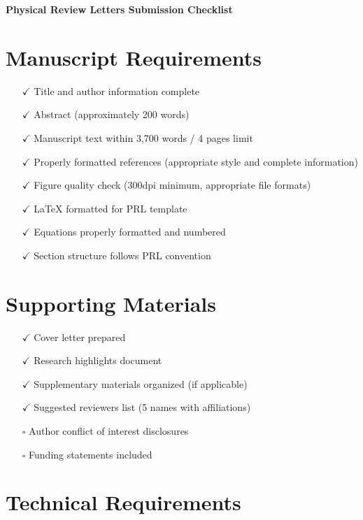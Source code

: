 \documentclass[11pt,letterpaper]{article}
\begin{document}
\begin{center}
\Large\textbf{Physical Review Letters Submission Checklist}
\end{center}

\section*{Manuscript Requirements}

\begin{itemize}[leftmargin=*]
\item[$\checkmark$] Title and author information complete
\item[$\checkmark$] Abstract (approximately 200 words)
\item[$\checkmark$] Manuscript text within 3,700 words / 4 pages limit
\item[$\checkmark$] Properly formatted references (appropriate style and complete information)
\item[$\checkmark$] Figure quality check (300dpi minimum, appropriate file formats)
\item[$\checkmark$] LaTeX formatted for PRL template
\item[$\checkmark$] Equations properly formatted and numbered
\item[$\checkmark$] Section structure follows PRL convention
\end{itemize}

\section*{Supporting Materials}

\begin{itemize}[leftmargin=*]
\item[$\checkmark$] Cover letter prepared
\item[$\checkmark$] Research highlights document
\item[$\checkmark$] Supplementary materials organized (if applicable)
\item[$\checkmark$] Suggested reviewers list (5 names with affiliations)
\item[$\square$] Author conflict of interest disclosures
\item[$\square$] Funding statements included
\end{itemize}

\section*{Technical Requirements}
\end{document}
